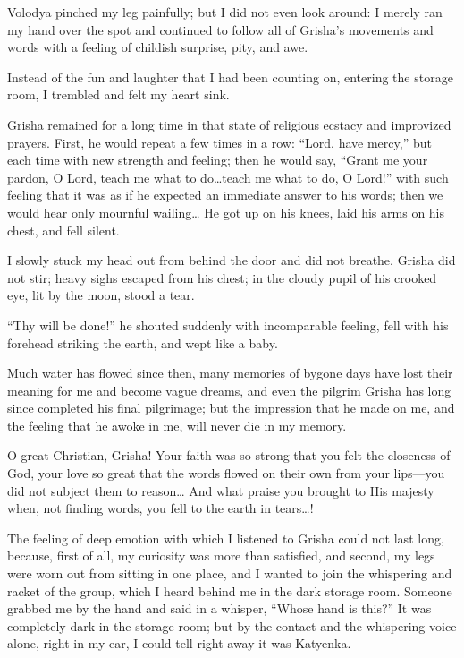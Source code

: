 Volodya pinched my leg painfully; but I did not even look around: I merely ran my hand over the spot and continued to follow all of Grisha's movements and words with a feeling of childish surprise, pity, and awe.

Instead of the fun and laughter that I had been counting on, entering the storage room, I trembled and felt my heart sink.

Grisha remained for a long time in that state of religious ecstacy and improvized prayers. First, he would repeat a few times in a row: ``Lord, have mercy,'' but each time with new strength and feeling; then he would say, ``Grant me your pardon, O Lord, teach me what to do\ldots{}teach me what to do, O Lord!'' with such feeling that it was as if he expected an immediate answer to his words; then we would hear only mournful wailing\ldots{} He got up on his knees, laid his arms on his chest, and fell silent. %

I slowly stuck my head out from behind the door and did not breathe. Grisha did not stir; heavy sighs escaped from his chest; in the cloudy pupil of his crooked eye, lit by the moon, stood a tear. 

``Thy will be done!'' he shouted suddenly with incomparable feeling, fell with his forehead striking the earth, and wept like a baby. %

Much water has flowed since then, many memories of bygone days have lost their meaning for me and become vague dreams, and even the pilgrim Grisha has long since completed his final pilgrimage; but the impression that he made on me, and the feeling that he awoke in me, will never die in my memory.

O great Christian, Grisha! Your faith was so strong that you felt the closeness of God, your love so great that the words flowed on their own from your lips---you did not subject them to reason\ldots{} And what praise you brought to His majesty when, not finding words, you fell to the earth in tears\ldots{}!

The feeling of deep emotion with which I listened to Grisha could not last long, because, first of all, my curiosity was more than satisfied, and second, my legs were worn out from sitting in one place, and I wanted to join the whispering and racket of the group, which I heard behind me in the dark storage room. Someone grabbed me by the hand and said in a whisper, ``Whose hand is this?'' It was completely dark in the storage room; but by the contact and the whispering voice alone, right in my ear, I could tell right away it was Katyenka.

